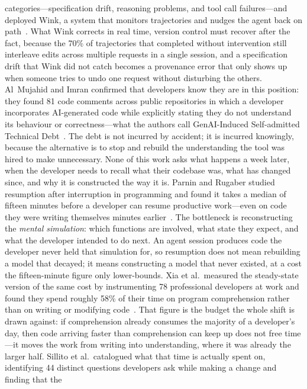 categories---specification drift, reasoning problems, and tool call
failures---and deployed Wink, a system that monitors trajectories and nudges the
agent back on path~\cite{nanda2026wink}. What Wink corrects in real time, version
control must recover after the fact, because the 70\% of trajectories that
completed without intervention still interleave edits across multiple requests
in a single session, and a specification drift that Wink did not catch becomes a
provenance error that only shows up when someone tries to undo one request without
disturbing the others. Al~Mujahid
and Imran confirmed that developers know they are in this position: they found 81
code comments across public repositories in which a developer incorporates
AI-generated code while explicitly stating they do not understand its behaviour or
correctness---what the authors call GenAI-Induced Self-admitted Technical
Debt~\cite{mujahid2026}. The debt is not incurred by accident; it is incurred
knowingly, because the alternative is to stop and rebuild the understanding the
tool was hired to make unnecessary. None of this work asks what happens a week later,
when the developer needs to recall what their codebase was, what has changed
since, and why it is constructed the way it is. Parnin and Rugaber studied
resumption after interruption in programming and found it takes a median of
fifteen minutes before a developer can resume productive work---even on code
they were writing themselves minutes
earlier~\cite{parnin2011}. The bottleneck is reconstructing the
\emph{mental simulation}: which functions are involved, what state they expect,
and what the developer intended to do next. An agent session produces code the
developer never held that simulation for, so resumption does not mean rebuilding
a model that decayed; it means constructing a model that never existed, at a
cost the fifteen-minute figure only lower-bounds. Xia et al.\ measured the
steady-state version of the same cost by instrumenting 78 professional
developers at work and found they spend roughly 58\% of their time on program
comprehension rather than on writing or modifying
code~\cite{xia2018}. That figure is the budget the whole shift is drawn against:
if comprehension already consumes the majority of a developer's day, then code
arriving faster than comprehension can keep up does not free time---it moves the
work from writing into understanding, where it was already the larger half.
Sillito et al.\ catalogued what that time is actually spent on, identifying 44
distinct questions developers ask while making a change and finding that the
